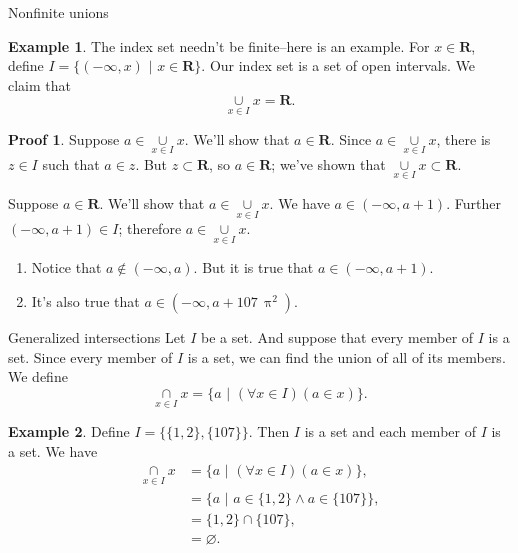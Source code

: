\documentclass[fleqn]{beamer}
\newcommand{\reals}{\mathbf{R}}
\theoremstyle{definition}
\newtheorem{myex}{Example}
\newtheorem{myproof}{Proof}
\begin{document}
\begin{frame}{Nonfinite unions}

\begin{myex}  The index set needn't be finite--here is an example.  For \(x \in \reals\), define \( I = \{ (-\infty, x) \,\, | \,\, x \in \reals \} \). Our index set is a set of open intervals.
We claim that
\[
    \underset{x \in I}{\cup} x  = \reals.
\]
\end{myex}

\begin{myproof}  Suppose \(a \in   \underset{x \in I}{\cup} x  \).  We'll show that \(a \in \reals\).  Since  \(a \in   \underset{x \in I}{\cup} x  \), there is \(z \in I\) such that \(a \in z\).  But \(z \subset \reals\), so \(a \in \reals\); we've shown that   \( \underset{x \in I}{\cup} x  \subset \reals\).

\quad Suppose \(a \in   \reals\).   We'll show that \(a \in  \underset{x \in I}{\cup} x  \).  We have \(a \in (-\infty, a + 1)\). Further  \( (-\infty, a + 1) \in I\); therefore  \(a \in  \underset{x \in I}{\cup} x \).
\end{myproof}

\begin{enumerate}

\item Notice that \( a \not \in  (-\infty, a)\).  But it is true that \(a \in (-\infty, a + 1)\).

\item It's also true that  \(a \in (-\infty, a + 107 \, \uppi^2)\).
\end{enumerate}
\end{frame}

\begin{frame}{Generalized intersections}
Let \(I\) be a set. And suppose that every member of \(I\) is a set.  Since every member of \(I\) is a set, we can find the union of all of its members. We define
\[
    \underset{x \in I}{\cap} x  = \{ a  \, \,  | \, \, (\forall x \in I)(a \in x) \}.
\]


\begin{myex}  Define \(I = \{ \{1,2\}, \{107\} \} \). Then \(I\) is a set and each member of \(I\) is a set. We have
\begin{align*}
 \underset{x \in I}{\cap} x  &= \{ a  \, \,  | \, \, (\forall x \in I)(a \in x) \}, \\
                                                   &= \{ a  \, \,  | \, \,   a \in   \{1,2\}  \land    a \in   \{107\} \}, \\
                                                   &= \{1,2\}  \cap \{107\}, \\
                                                   &=  \varnothing.
\end{align*}

\end{myex}
\end{frame}
\end{document}
